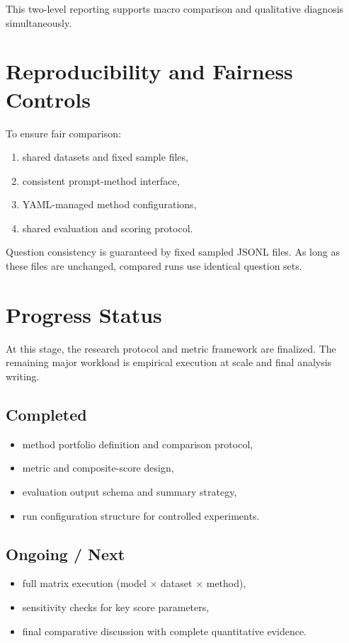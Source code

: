 \documentclass[11pt]{article}
\begin{document}
This two-level reporting supports macro comparison and qualitative diagnosis simultaneously.

\section{Reproducibility and Fairness Controls}

To ensure fair comparison:
\begin{enumerate}[leftmargin=*]
    \item shared datasets and fixed sample files,
    \item consistent prompt-method interface,
    \item YAML-managed method configurations,
    \item shared evaluation and scoring protocol.
\end{enumerate}

Question consistency is guaranteed by fixed sampled JSONL files. As long as these files are unchanged, compared runs use identical question sets.

\section{Progress Status}

At this stage, the research protocol and metric framework are finalized. The remaining major workload is empirical execution at scale and final analysis writing.

\subsection{Completed}
\begin{itemize}[leftmargin=*]
    \item method portfolio definition and comparison protocol,
    \item metric and composite-score design,
    \item evaluation output schema and summary strategy,
    \item run configuration structure for controlled experiments.
\end{itemize}

\subsection{Ongoing / Next}
\begin{itemize}[leftmargin=*]
    \item full matrix execution (model $\times$ dataset $\times$ method),
    \item sensitivity checks for key score parameters,
    \item final comparative discussion with complete quantitative evidence.
\end{itemize}
\end{document}
